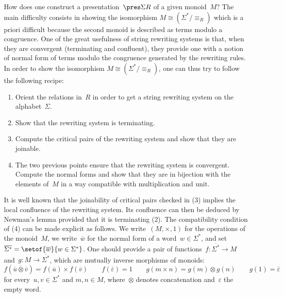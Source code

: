 \documentclass{LMCS}
\begin{document}
How does one construct a presentation~$\pres\Sigma R$ of a given monoid~$M$? The
main difficulty consists in showing the isomorphism
$M\cong(\Sigma^*/\equiv_R)$ which is a priori difficult because the second
monoid is described as terms modulo a congruence. One of the great usefulness of
string rewriting systems is that, when they are convergent (\ie terminating and
confluent), they provide one with a notion of normal form of terms modulo the
congruence generated by the rewriting rules. In order to show the isomorphism
$M\cong(\Sigma^*/\equiv_R)$, one can thus try to follow the following recipe:
\begin{enumerate}
\item Orient the relations in~$R$ in order to get a string rewriting system on
  the alphabet~$\Sigma$.
\item Show that the rewriting system is terminating.
\item Compute the critical pairs of the rewriting system and show that they are
  joinable.
\item The two previous points ensure that the rewriting system is
  convergent. Compute the normal forms and show that they are in bijection with
  the elements of~$M$ in a way compatible with multiplication and unit.
\end{enumerate}
It is well known that the joinability of critical pairs checked in (3) implies
the local confluence of the rewriting system. Its confluence can then be deduced
by Newman's lemma provided that it is terminating (2). The compatibility
condition of (4) can be made explicit as follows. We write~$(M,\times,1)$ for
the operations of the monoid~$M$, we write~$\overline{w}$ for the normal form of
a word~$w\in\Sigma^*$, and
set~$\overline{\Sigma^*}=\setof{\overline{w}}{w\in\Sigma^*}$. One should provide
a pair of functions~$f:\overline{\Sigma^*}\to M$
and~$g:M\to\overline{\Sigma^*}$, which are mutually inverse morphisms of
monoids:
\[
f(\overline{\overline u\otimes\overline v})=f(\overline u)\times f(\overline v)
\qquad
f(\overline\varepsilon)=1
\qquad
g(m\times n)=g(m)\otimes g(n)
\qquad
g(1)=\overline\varepsilon
\]
for every~$u,v\in\Sigma^*$ and $m,n\in M$, where~$\otimes$ denotes concatenation
and~$\varepsilon$ the empty word.
\end{document}
